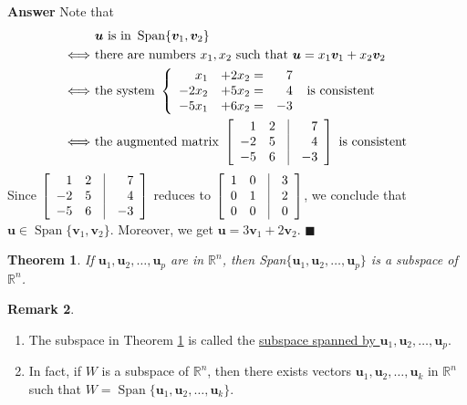 \documentclass[12pt,letterpaper]{book}
\numberwithin{equation}{section}
\newtheorem{thm}{\textbf{Theorem}}[section]
\theoremstyle{definition}
\newtheorem{remark}[thm]{\textbf{Remark}}
\newenvironment{answer}{\noindent\textbf{Answer}}{\hfill$\blacksquare$\vspace{0.1in}}
\newcommand{\vu}{\bm{u}}
\newcommand{\vv}{\bm{v}}
\newcommand{\Span}{\operatorname{Span}}
\begin{document}
\begin{answer} Note that
\begin{align*}
&~\vu \text{ is in } \Span\{\vv_1,\vv_2\}\\
\Longleftrightarrow &~\text{there are numbers }x_1,x_2 \text{ such that }\vu=x_1\vv_1+x_2\vv_2\\
\Longleftrightarrow &~\text{the system }\left\{\begin{array}{rrr}
x_1&+2x_2=&7 \\
-2x_2 &+5x_2=&4\\
-5x_1&+6x_2=&-3 \end{array}\right. \text{ is consistent}\\
\Longleftrightarrow &~\text{the augmented matrix }\left[\begin{array}{rr@{\quad}|@{\quad}r} 1 & 2 &   7 \\ -2 & 5 &  4
\\ -5 & 6 &  -3 \end{array}\right] \text{ is consistent}
\end{align*}
Since $\left[\begin{array}{rr@{\quad}|@{\quad}r} 1 & 2 &  7 \\ -2 & 5  & 4
\\ -5 & 6  & -3 \end{array}\right]$ reduces to $\left[\begin{array}{rr@{\quad}|@{\quad}r} 1 & 0  & 3 \\ 0 & 1 & 2
\\ 0 & 0 &  0 \end{array}\right]$, we conclude that $\vu \in \Span\{\vv_1,\vv_2\}$. Moreover, we get $\vu=3\vv_1+2\vv_2$.
\end{answer}

\begin{thm}\label{span is subsp} If $\vu_1,\vu_2,\ldots, \vu_p$ are in $\mathbb{R}^n$, then Span$\{\vu_1,\vu_2,\ldots, \vu_p\}$ is a
subspace of $\mathbb{R}^n$.
\end{thm}

\begin{remark}\label{span converse}\quad
\begin{enumerate}
\item The subspace in Theorem \ref{span is subsp} is called the \ul{subspace spanned by $\vu_1,\vu_2,\ldots, \vu_p$}.
\item In fact, if $W$ is a subspace of $\mathbb{R}^n$, then there exists vectors $\vu_1,\vu_2,\ldots, \vu_k$ in $\mathbb{R}^n$ such that $W=\Span\{\vu_1,\vu_2,\ldots, \vu_k\}$.
\end{enumerate}
\end{remark}
\end{document}
